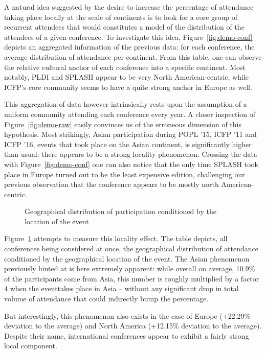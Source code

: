 \documentclass{scrartcl}
\newcommand{\event}{event} %
\newcommand{\conf}{conference}
\begin{document}
A natural idea suggested by the desire to increase the percentage of attendance
taking place locally at the scale of continents is to look for a core group of
recurrent attendees that would constitutes a model of the distribution of the
attendees of a given conference. To investigate this idea, Figure~\ref{fig:demo-conf}
depicts an aggregated information of the previous data: for each 
\conf, the average distribution of attendance per continent. From this
table, one can observe the relative cultural anchor of each conference into a
specific continent. Most notably, PLDI and SPLASH appear to be very North
American-centric, while ICFP's core community seems to have a quite strong
anchor in Europe as well.

This aggregation of data however intrinsically rests upon the assumption of a uniform
community attending each conference every year. A closer inspection of
Figure~\ref{fig:demo-raw} easily convinces us of the erroneous dimension of this
hypothesis. Most strikingly, Asian participation during POPL '15, ICFP '11 and
ICFP '16, events that took place on the Asian continent, is significantly higher
than usual: there appears to be a strong locality phenomenon. Crossing the data with
Figure~\ref{fig:demo-conf} one can also notice that the only time SPLASH took
place in Europe turned out to be the least expensive edition, challenging our previous
observation that the conference appears to be mostly north American-centric.

\begin{figure}
\caption{Geographical distribution of participation conditioned by the location of the \event}
\label{fig:local_effect}
\end{figure}

Figure~\ref{fig:local_effect} attempts to measure this locality effect. The
table depicts, all conferences being considered at once, the geographical
distribution of attendance conditioned by the geographical location of the
\event. The Asian phenomenon previously hinted at is here extremely
apparent: while overall on average, 10.9\% of the participants come from Asia,
this number is roughly multiplied by a factor 4 when the \event takes place in Asia --
without any significant drop in total volume of attendance that could indirectly bump
the percentage.

But interestingly, this phenomenon also exists in the case of Europe (+22.29\%
deviation to the average) and North America (+12.15\% deviation to the average).
Despite their name, international conferences appear to exhibit a fairly strong
local component.
\end{document}
